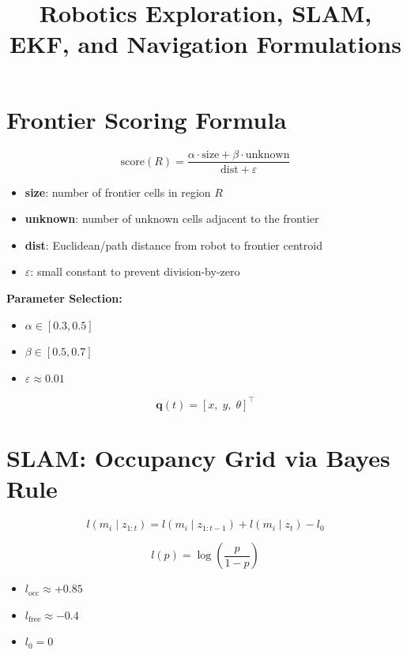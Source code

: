 \documentclass[11pt]{article}
\title{Robotics Exploration, SLAM, EKF, and Navigation Formulations}
\author{}
\date{}
\begin{document}
\maketitle

\section{Frontier Scoring Formula}

\begin{equation}
\text{score}(R) = \frac{\alpha \cdot \text{size} + \beta \cdot \text{unknown}}{\text{dist} + \varepsilon}
\end{equation}

\begin{itemize}
    \item \textbf{size}: number of frontier cells in region $R$
    \item \textbf{unknown}: number of unknown cells adjacent to the frontier
    \item \textbf{dist}: Euclidean/path distance from robot to frontier centroid
    \item $\varepsilon$: small constant to prevent division-by-zero
\end{itemize}

\textbf{Parameter Selection:}
\begin{itemize}
    \item $\alpha \in [0.3, 0.5]$
    \item $\beta \in [0.5, 0.7]$
    \item $\varepsilon \approx 0.01$
\end{itemize}

\begin{equation}
\mathbf{q}(t) = [x,\; y,\; \theta]^\top
\end{equation}

\section{SLAM: Occupancy Grid via Bayes Rule}

\begin{equation}
l(m_i \mid z_{1:t}) = l(m_i \mid z_{1:t-1}) + l(m_i \mid z_t) - l_0
\end{equation}

\begin{equation}
l(p) = \log\left(\frac{p}{1-p}\right)
\end{equation}

\begin{itemize}
    \item $l_{\text{occ}} \approx +0.85$
    \item $l_{\text{free}} \approx -0.4$
    \item $l_0 = 0$
\end{itemize}
\end{document}
